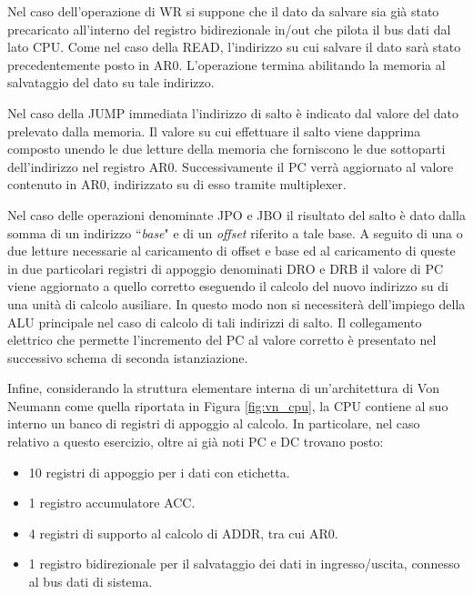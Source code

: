Nel caso dell'operazione di WR si suppone che il dato da salvare sia già stato precaricato all'interno del registro bidirezionale in/out che pilota il bus dati dal lato CPU. Come nel caso della READ, l'indirizzo su cui salvare il dato sarà stato precedentemente posto in AR0. L'operazione termina abilitando la memoria al salvataggio del dato su tale indirizzo.
\par \bigskip \noindent
Nel caso della JUMP immediata l'indirizzo di salto è indicato dal valore del dato prelevato dalla memoria. Il valore su cui effettuare il salto viene dapprima composto unendo le due letture della memoria che forniscono le due sottoparti dell'indirizzo nel registro AR0. Successivamente il PC verrà aggiornato al valore contenuto in AR0, indirizzato su di esso tramite multiplexer.
\par \bigskip \noindent
Nel caso delle operazioni denominate JPO e JBO il risultato del salto è dato dalla somma di un indirizzo \textquotedblleft \textit{base}" e di un \textit{offset} riferito a tale base. A seguito di una o due letture necessarie al caricamento di offset e base ed al caricamento di queste in due particolari registri di appoggio denominati DRO e DRB il valore di PC viene aggiornato a quello corretto eseguendo il calcolo del nuovo indirizzo su di una unità di calcolo ausiliare. In questo modo non si necessiterà dell'impiego della ALU principale nel caso di calcolo di tali indirizzi di salto. Il collegamento elettrico che permette l'incremento del PC al valore corretto è presentato nel successivo schema di seconda istanziazione.
\par \bigskip \noindent
Infine, considerando la struttura elementare interna di un'architettura di Von Neumann come quella riportata in Figura \ref{fig:vn_cpu}, la CPU contiene al suo interno un banco di registri di appoggio al calcolo. In particolare, nel caso relativo a questo esercizio, oltre ai già noti PC e DC trovano posto:
\begin{itemize}
	\item 10 registri di appoggio per i dati con etichetta.
	\item 1 registro accumulatore ACC.
	\item 4 registri di supporto al calcolo di ADDR, tra cui AR0.
	\item 1 registro bidirezionale per il salvataggio dei dati in ingresso/uscita, connesso al bus dati di sistema.
\end{itemize}
